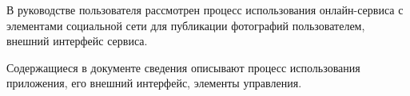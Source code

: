 
В руководстве пользователя рассмотрен процесс использования онлайн-сервиса с элементами социальной сети для публикации фотографий пользователем, внешний интерфейс сервиса.

Содержащиеся в документе сведения описывают процесс использования приложения, его внешний интерфейс, элементы управления.

\clearpage